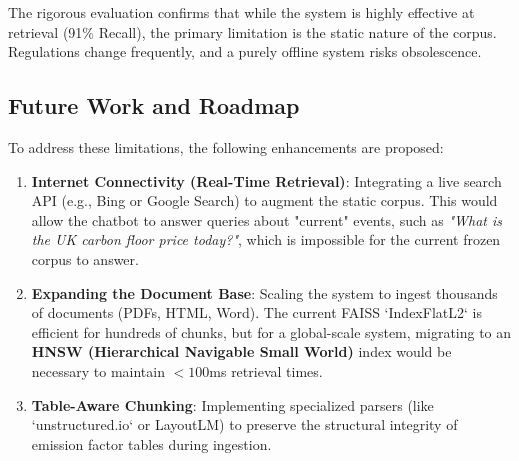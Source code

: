 \documentclass[12pt, a4paper]{article}
\begin{document}
The rigorous evaluation confirms that while the system is highly effective at retrieval (91\% Recall), the primary limitation is the static nature of the corpus. Regulations change frequently, and a purely offline system risks obsolescence.

\subsection{Future Work and Roadmap}
To address these limitations, the following enhancements are proposed:
\begin{enumerate}
    \item \textbf{Internet Connectivity (Real-Time Retrieval)}: 
    Integrating a live search API (e.g., Bing or Google Search) to augment the static corpus. This would allow the chatbot to answer queries about "current" events, such as \textit{"What is the UK carbon floor price today?"}, which is impossible for the current frozen corpus to answer.
    
    \item \textbf{Expanding the Document Base}: 
    Scaling the system to ingest thousands of documents (PDFs, HTML, Word). The current FAISS `IndexFlatL2` is efficient for hundreds of chunks, but for a global-scale system, migrating to an \textbf{HNSW (Hierarchical Navigable Small World)} index would be necessary to maintain $<100$ms retrieval times.
    
    \item \textbf{Table-Aware Chunking}: 
    Implementing specialized parsers (like `unstructured.io` or LayoutLM) to preserve the structural integrity of emission factor tables during ingestion.
\end{enumerate}
\end{document}
